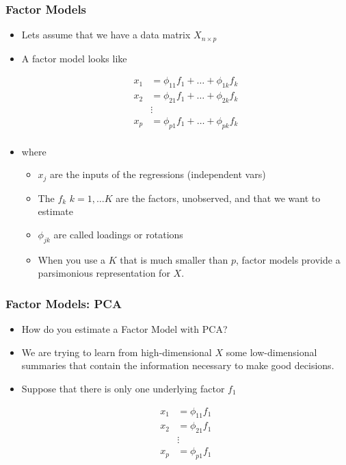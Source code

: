 \documentclass[
  shownotes,
  xcolor={svgnames},
  hyperref={colorlinks,citecolor=DarkBlue,linkcolor=DarkRed,urlcolor=DarkBlue}
  , aspectratio=169]{beamer}
\begin{document}
\begin{frame}
\frametitle{Factor Models}

\begin{itemize}
  \item Lets assume that we have a data matrix $X_{n\times p}$
  \medskip
\item A factor model looks like 

\begin{align}
x_{1}&=  \phi_{11} f_{1} + \dots + \phi_{1k} f_{k} \\ \nonumber
x_{2}&=  \phi_{21} f_{1} + \dots + \phi_{2k} f_{k} \\ \nonumber
&\vdots  \\ \nonumber
x_{p} &=  \phi_{p1} f_{1} + \dots + \phi_{pk} f_{k} \\ \nonumber
\end{align}

\item where 
  \begin{itemize}
    \footnotesize
   \item $x_{j}$ are the inputs of the regressions (independent vars)
   \medskip
   \item The $f_{k}$ $k=1,\dots K$ are the factors, unobserved, and that we want to estimate
  \medskip
   \item $\phi_{jk}$  are called loadings or rotations
  \medskip
   \item When you use a $K$ that is much smaller than $p$, factor models provide a parsimonious representation for $X$. 
   
  \end{itemize}


\end{itemize}
\end{frame}
\begin{frame}
\frametitle{Factor Models: PCA}

\begin{itemize}
\item How do you estimate a Factor Model with PCA?
\medskip
\item We are trying to learn from high-dimensional $X$ some low-dimensional summaries that contain the information necessary to make good decisions. 
\pause
\medskip
\item Suppose that there is only one underlying factor $f_1$
\medskip

\begin{align}
x_{1}&=  \phi_{11} f_{1} \\ \nonumber
x_{2}&=  \phi_{21} f_{1} \\ \nonumber
&\vdots  \\ \nonumber
x_{p} &=  \phi_{p1} f_{1} \\ \nonumber
\end{align}


\end{itemize}
\end{frame}
\end{document}
